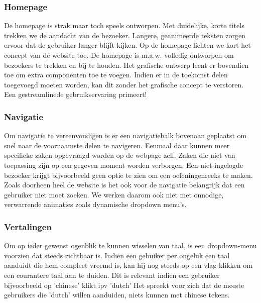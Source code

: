 \subsubsection{Homepage}
De homepage is strak maar toch speels ontworpen. Met duidelijke, korte titels trekken we de aandacht van de bezoeker.
Langere, geanimeerde teksten zorgen ervoor dat de gebruiker langer blijft kijken. Op de homepage lichten we kort het concept
van de website toe. De homepage is m.a.w. volledig ontworpen om bezoekers te trekken en bij te houden. Het grafische ontwerp
leent er bovendien toe om extra componenten toe te voegen. Indien er in de toekomst delen toegevoegd moeten worden, kan dit
zonder het grafische concept te verstoren. Een gestreamlinede gebruikservaring primeert!

\subsubsection{Navigatie}
Om navigatie te vereenvoudigen is er een navigatiebalk bovenaan geplaatst om snel naar de voornaamste
delen te navigeren. Eenmaal daar kunnen meer specifieke zaken opgevraagd worden op de webpage zelf.
Zaken die niet van toepassing zijn op een gegeven moment worden verborgen. Een niet-ingelogde bezoeker
krijgt bijvoorbeeld geen optie te zien om een oefeningenreeks te maken. Zoals doorheen heel de website is
het ook voor de navigatie belangrijk dat een gebruiker niet moet zoeken. We werken daarom ook niet met
onnodige, verwarrende animaties zoals dynamische dropdown menu's.

\subsubsection{Vertalingen}
Om op ieder gewenst ogenblik te kunnen wisselen van taal, is een dropdown-menu voorzien dat steeds zichtbaar is.
Indien een gebuiker per ongeluk een taal aanduidt die hem compleet vreemd is, kan hij nog steeds op een vlag klikken
om een courantere taal aan te duiden. Dit is relevant indien een gebruiker bijvoorbeeld op 'chinese' klikt ipv 'dutch'
Het spreekt voor zich dat de meeste gebruikers die 'dutch' willen aanduiden, niets kunnen met chinese tekens.
